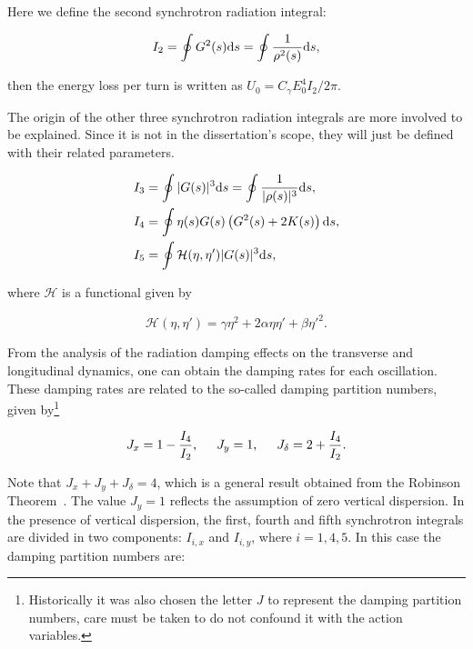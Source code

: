 Here we define the second synchrotron radiation integral:

\begin{equation}
    I_2 = \oint G^{2}(s) \mathrm{d} s = \oint \dfrac{1}{\rho^2(s)} \mathrm{d} s,
\end{equation}

then the energy loss per turn is written as $U_0 = C_{\gamma}E_0^4 I_2/2\pi$.

The origin of the other three synchrotron radiation integrals are more involved to be explained. Since it is not in the dissertation's scope, they will just be defined with their related parameters. 

\begin{align}
    I_3 &= \oint |G(s)|^3 \mathrm{d} s = \oint \dfrac{1}{|\rho(s)|^3} \mathrm{d} s, \\
    I_4 &= \oint \eta(s) G(s) \left(G^2(s) + 2 K(s)\right) \mathrm{d} s, \\
    I_5 &= \oint \mathcal{H}(\eta, \eta') |G(s)|^3 \mathrm{d} s,
    \label{eq:integral5}
\end{align}

where $\mathcal{H}$ is a functional given by

\begin{equation}
    \mathcal{H}(\eta, \eta') = \gamma \eta^2 + 2 \alpha \eta \eta' + \beta {\eta'}^2.
\end{equation}

From the analysis of the radiation damping effects on the transverse and longitudinal dynamics, one can obtain the damping rates for each oscillation. These damping rates are related to the so-called damping partition numbers, given by\footnote{Historically it was also chosen the letter $J$ to represent the damping partition numbers, care must be taken to do not confound it with the action variables.}

\begin{equation}
    J_x = 1 - \dfrac{I_4}{I_2}, \hspace{0.5cm} J_y = 1, \hspace{0.5cm} J_{\delta} = 2 + \dfrac{I_4}{I_2}.
\end{equation}

Note that $J_x + J_y + J_{\delta} = 4$, which is a general result obtained from the Robinson Theorem~\cite{Robinson1958}. The value $J_y = 1$ reflects the assumption of zero vertical dispersion. In the presence of vertical dispersion, the first, fourth and fifth synchrotron integrals are divided in two components: $I_{i, x}$ and $I_{i, y}$, where $i = 1, 4, 5$. In this case the damping partition numbers are: 

